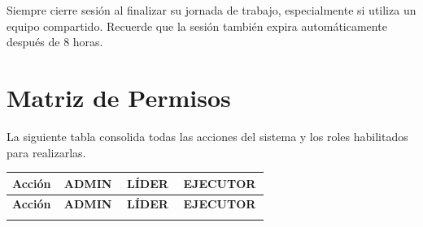 \documentclass[12pt, a4paper]{article}
\newcommand{\rolbadge}[2]{%
  \colorbox{#1}{\color{white}\footnotesize\bfseries\,#2\,}%
}
\newcommand{\admin}{\rolbadge{admincolor}{ADMIN}}
\newcommand{\leader}{\rolbadge{leadercolor}{LÍDER}}
\newcommand{\executor}{\rolbadge{executorcolor}{EJECUTOR}}
\begin{document}
\begin{infobox}
Siempre cierre sesión al finalizar su jornada de trabajo, especialmente si utiliza un equipo compartido. Recuerde que la sesión también expira automáticamente después de 8 horas.
\end{infobox}

\section{Matriz de Permisos}

La siguiente tabla consolida todas las acciones del sistema y los roles habilitados para realizarlas.

\begin{longtable}{L{5.5cm} C{2.2cm} C{2.2cm} C{2.2cm}}
\toprule
\textbf{Acción} & \admin & \leader & \executor \\
\midrule
\endfirsthead
\toprule
\textbf{Acción} & \admin & \leader & \executor \\
\midrule
\endhead
\bottomrule
\endlastfoot


\end{longtable}
\end{document}
